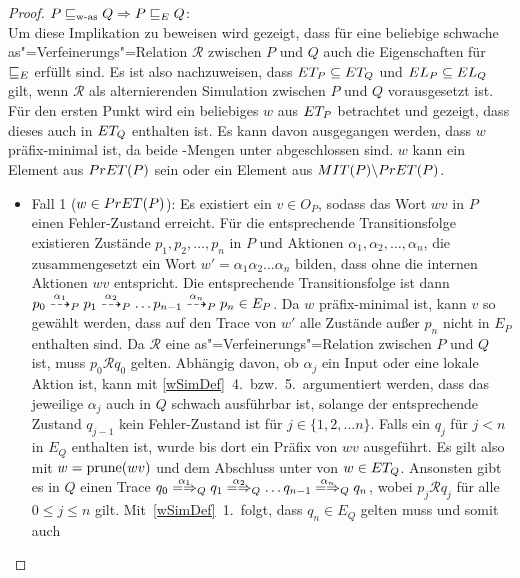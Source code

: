 \begin{proof}
  $P\sqsubseteq _{\mathrm{w}\text{-}\mathrm{as}} Q\Rightarrow P \sqsubseteq  _E Q$:\\
  Um diese Implikation zu beweisen wird gezeigt, dass für eine beliebige
  schwache as"=Verfeinerungs"=Relation $\mathcal{R}$ zwischen $P$ und $Q$ auch
  die Eigenschaften für $ \sqsubseteq  _E$ erfüllt sind. Es ist also nachzuweisen, dass
  $ET _P \subseteq ET _Q$ und $EL _P \subseteq EL _Q$ gilt, wenn
  $\mathcal{R}$ als alternierenden Simulation zwischen $P$ und $Q$
  vorausgesetzt ist.\\
  Für den ersten Punkt wird ein beliebiges $w$ aus $ET _P$ betrachtet und
  gezeigt, dass dieses auch in $ET _Q$ enthalten ist. Es kann davon
  ausgegangen werden, dass $w$ präfix-minimal ist, da beide \ET{}-Mengen unter
  \cont{} abgeschlossen sind. $w$ kann ein Element aus $PrET (P)$ sein oder
  ein Element aus $MIT (P)\backslash PrET (P)$.
  \begin{itemize}
    \item Fall 1 ($w\in PrET (P)$): Es existiert ein $v\in O_P$, sodass das
      Wort $wv$ in $P$ einen Fehler-Zustand erreicht. Für die entsprechende
      Transitionsfolge existieren Zustände $p_1, p_2,\dots , p_n$ in $P$ und
      Aktionen $\alpha _1, \alpha _2,\dots , \alpha _n$, die zusammengesetzt
      ein Wort $w'=\alpha _1 \alpha _2 \dots \alpha _n$ bilden, dass ohne die
      internen Aktionen $wv$ entspricht. Die entsprechende Transitionsfolge ist
      dann $p_0 \may[\alpha _1]_P p_1 \may[\alpha _2]_P \dots p_{n-1}
      \may[\alpha _n]_P p_n \in E_P$. Da $w$ präfix-minimal ist, kann $v$ so
      gewählt werden, dass auf den Trace von $w'$ alle Zustände außer $p_n$
      nicht in $E_P$ enthalten sind. Da $\mathcal{R}$ eine
      as"=Verfeinerungs"=Relation zwischen $P$ und $Q$ ist, muss
      $p_0\mathcal{R}q_0$ gelten. Abhängig davon, ob $\alpha _j$ ein Input oder
      eine lokale Aktion ist, kann mit \ref{wSimDef}~4.\ bzw.~5.\ argumentiert
      werden, dass das jeweilige $\alpha _j$ auch in $Q$ schwach ausführbar
      ist, solange der entsprechende Zustand $q_{j-1}$ kein Fehler-Zustand ist
      für $j\in \{1,2,\dots n\}$. Falls ein $q_j$ für $j < n$ in $E_Q$
      enthalten ist, wurde bis dort ein Präfix von $wv$ ausgeführt. Es gilt
      also mit $w=\mathrm{prune} (wv)$ und dem Abschluss unter \cont{} von \ET{}
      $w\in ET _Q$. Ansonsten gibt es in $Q$ einen Trace $q_0 \weakmay[\alpha
      _1]_Q q_1 \weakmay[\alpha _2]_Q \dots q_{n-1} \weakmay[\alpha _n]_Q q_n$,
      wobei $p_j \mathcal{R} q_j$ für alle $0 \leq j \leq n$ gilt.
      Mit~\ref{wSimDef}~1.\ folgt, dass $q_n\in E_Q$ gelten muss und somit auch

\end{itemize}
\end{proof}
